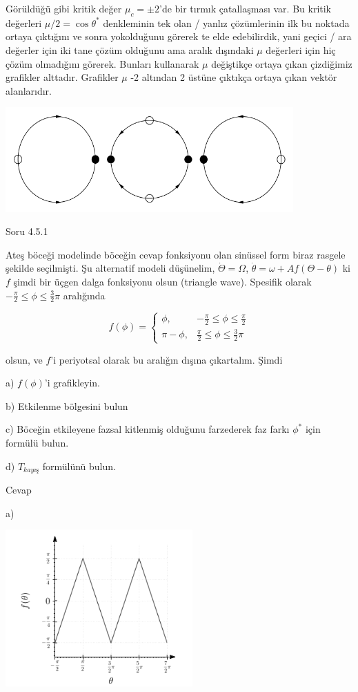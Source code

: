 \documentclass[12pt,fleqn]{article}\usepackage{../../common}
\begin{document}
Görüldüğü gibi kritik değer $\mu_c= \pm 2$'de bir tırmık çatallaşması var. Bu
kritik değerleri $\mu/2 = \cos\theta^\ast$ denkleminin tek olan / yanlız
çözümlerinin ilk bu noktada ortaya çıktığını ve sonra yokolduğunu görerek te
elde edebilirdik, yani geçici / ara değerler için iki tane çözüm olduğunu ama
aralık dışındaki $\mu$ değerleri için hiç çözüm olmadığını görerek. Bunları
kullanarak $\mu$ değiştikçe ortaya çıkan çizdiğimiz grafikler
alttadır. Grafikler $\mu$ -2 altından 2 üstüne çıktıkça ortaya çıkan vektör
alanlarıdır.

\includegraphics[height=4cm]{12_03.png}

Soru 4.5.1

Ateş böceği modelinde böceğin cevap fonksiyonu olan sinüssel form biraz rasgele
şekilde seçilmişti. Şu alternatif modeli düşünelim, $\dot{\Theta} = \Omega$,
$\dot{\theta} = \omega + A f(\Theta-\theta)$ ki $f$ şimdi bir üçgen dalga
fonksiyonu olsun (triangle wave). Spesifik olarak $-\frac{\pi}{2} \le \phi \le
\frac{3}{2}\pi$ aralığında 

$$ f(\phi) =
\left\{ \begin{array}{ll}
\phi, & -\frac{\pi}{2} \le \phi \le \frac{\pi}{2} \\
\pi-\phi, & \frac{\pi}{2} \le \phi \le \frac{3}{2}\pi
\end{array} \right.
$$

olsun, ve $f$'i periyotsal olarak bu aralığın dışına çıkartalım. Şimdi

a) $f(\phi)$'i grafikleyin.

b) Etkilenme bölgesini bulun

c) Böceğin etkileyene fazsal kitlenmiş olduğunu farzederek faz farkı $\phi^\ast$
için formülü bulun.

d) $T_{kayış}$ formülünü bulun.

Cevap

a)

\includegraphics[height=6cm]{12_04.png}
\end{document}
